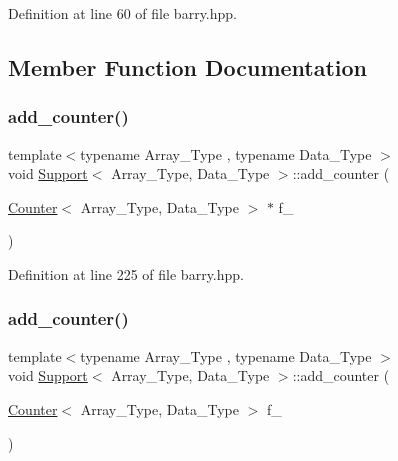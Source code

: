 Definition at line 60 of file barry.\+hpp.



\subsection{Member Function Documentation}
\mbox{\label{classbarry_1_1_support_a0ad8bb6202451253697d771a28859210}} 
\subsubsection{\texorpdfstring{add\+\_\+counter()}{add\_counter()}\hspace{0.1cm}{\footnotesize\ttfamily [1/2]}}
{\footnotesize\ttfamily template$<$typename Array\+\_\+\+Type , typename Data\+\_\+\+Type $>$ \\
void \hyperlink{classbarry_1_1_support}{Support}$<$ Array\+\_\+\+Type, Data\+\_\+\+Type $>$\+::add\+\_\+counter (\begin{DoxyParamCaption}\item[{\hyperlink{classbarry_1_1_counter}{Counter}$<$ Array\+\_\+\+Type, Data\+\_\+\+Type $>$ $\ast$}]{f\+\_\+ }\end{DoxyParamCaption})\hspace{0.3cm}{\ttfamily [inline]}}



Definition at line 225 of file barry.\+hpp.

\mbox{\label{classbarry_1_1_support_aa8680937a0237286a8b0401bca07cbf6}} 
\subsubsection{\texorpdfstring{add\+\_\+counter()}{add\_counter()}\hspace{0.1cm}{\footnotesize\ttfamily [2/2]}}
{\footnotesize\ttfamily template$<$typename Array\+\_\+\+Type , typename Data\+\_\+\+Type $>$ \\
void \hyperlink{classbarry_1_1_support}{Support}$<$ Array\+\_\+\+Type, Data\+\_\+\+Type $>$\+::add\+\_\+counter (\begin{DoxyParamCaption}\item[{\hyperlink{classbarry_1_1_counter}{Counter}$<$ Array\+\_\+\+Type, Data\+\_\+\+Type $>$}]{f\+\_\+ }\end{DoxyParamCaption})\hspace{0.3cm}{\ttfamily [inline]}}



